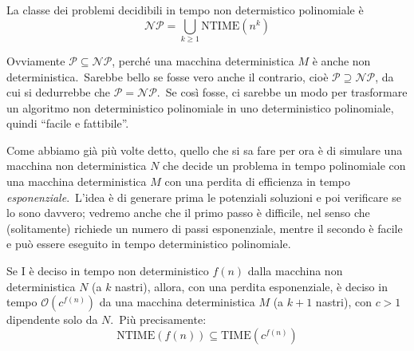 \begin{definition}
    La classe dei problemi decidibili in tempo non determistico polinomiale è
    \[\mathcal{NP} = \bigcup_{k \geq 1} \mathrm{NTIME}\left(n^k\right)\]
\end{definition}

\noindent Ovviamente $\mathcal{P} \subseteq \mathcal{NP}$, perché una macchina deterministica $M$ è anche non deterministica.\
Sarebbe bello se fosse vero anche il contrario, cioè $\mathcal{P} \supseteq \mathcal{NP}$, da cui si dedurrebbe che $\mathcal{P} = \mathcal{NP}$.\
Se così fosse, ci sarebbe un modo per trasformare un algoritmo non deterministico polinomiale in uno deterministico polinomiale, quindi ``facile e fattibile''.

Come abbiamo già più volte detto, quello che si sa fare per ora è di simulare una macchina non deterministica $N$ che decide un problema in tempo polinomiale con una macchina deterministica $M$ con una perdita di efficienza in tempo \textit{esponenziale}.\
L'idea è di generare prima le potenziali soluzioni e poi verificare se lo sono davvero; vedremo anche che il primo passo è difficile, nel senso che (solitamente) richiede un numero di passi esponenziale, mentre il secondo è facile e può essere eseguito in tempo deterministico polinomiale.\

\begin{theorem}
    \label{simulazione_non-deterministica}
    Se I è deciso in tempo non deterministico $f(n)$ dalla macchina non deterministica $N$ (a $k$ nastri), allora, con una perdita esponenziale, è deciso in tempo $\mathcal{O}\left(c^{f(n)}\right)$ da una macchina deterministica $M$ (a $k+1$ nastri), con $c > 1$ dipendente solo da $N$.\
    Più precisamente:
    \[\mathrm{NTIME}\left(f(n)\right) \subseteq \mathrm{TIME}\left(c^{f(n)}\right)\]
\end{theorem}

